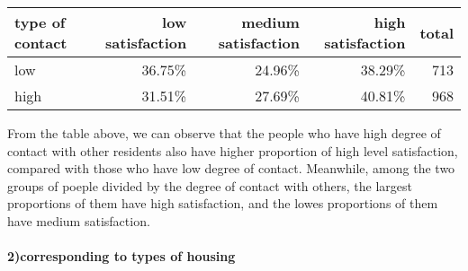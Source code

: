 \documentclass[]{article}
\newenvironment{Shaded}{\begin{snugshade}}{\end{snugshade}}
\newcommand{\KeywordTok}[1]{\textcolor[rgb]{0.13,0.29,0.53}{\textbf{#1}}}
\newcommand{\DataTypeTok}[1]{\textcolor[rgb]{0.13,0.29,0.53}{#1}}
\newcommand{\StringTok}[1]{\textcolor[rgb]{0.31,0.60,0.02}{#1}}
\newcommand{\OperatorTok}[1]{\textcolor[rgb]{0.81,0.36,0.00}{\textbf{#1}}}
\newcommand{\NormalTok}[1]{#1}
\let\oldparagraph\paragraph
\renewcommand{\paragraph}[1]{\oldparagraph{#1}\mbox{}}
\begin{document}
\begin{Shaded}
\end{Shaded}

\begin{longtable}[]{@{}lrrrr@{}}
\toprule
type of contact & low satisfaction & medium satisfaction & high
satisfaction & total\tabularnewline
\midrule
\endhead
low & 36.75\% & 24.96\% & 38.29\% & 713\tabularnewline
high & 31.51\% & 27.69\% & 40.81\% & 968\tabularnewline
\bottomrule
\end{longtable}

From the table above, we can observe that the people who have high
degree of contact with other residents also have higher proportion of
high level satisfaction, compared with those who have low degree of
contact. Meanwhile, among the two groups of poeple divided by the degree
of contact with others, the largest proportions of them have high
satisfaction, and the lowes proportions of them have medium
satisfaction.

\paragraph{2)corresponding to types of
housing}\label{corresponding-to-types-of-housing}
\end{document}
